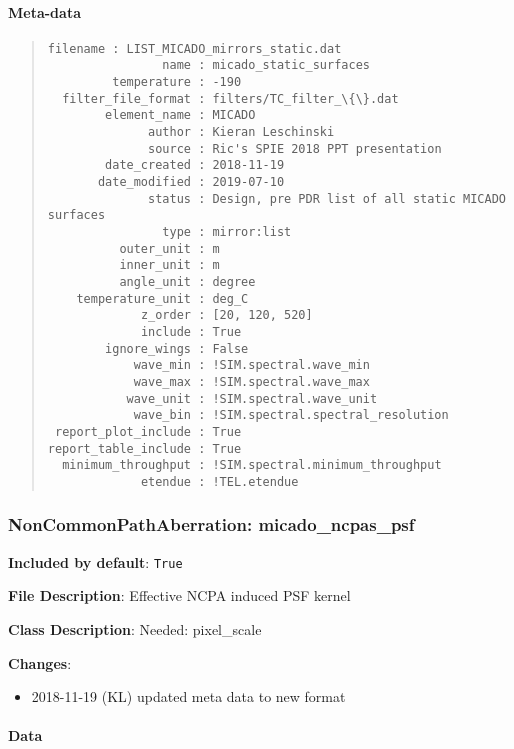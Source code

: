 \paragraph{Meta-data%
  \label{meta-data}%
}

\begin{quote}
\begin{alltt}
\begin{lstlisting}[frame=single]
            filename : LIST_MICADO_mirrors_static.dat
                name : micado_static_surfaces
         temperature : -190
  filter_file_format : filters/TC_filter_\{\}.dat
        element_name : MICADO
              author : Kieran Leschinski
              source : Ric's SPIE 2018 PPT presentation
        date_created : 2018-11-19
       date_modified : 2019-07-10
              status : Design, pre PDR list of all static MICADO surfaces
                type : mirror:list
          outer_unit : m
          inner_unit : m
          angle_unit : degree
    temperature_unit : deg_C
             z_order : [20, 120, 520]
             include : True
        ignore_wings : False
            wave_min : !SIM.spectral.wave_min
            wave_max : !SIM.spectral.wave_max
           wave_unit : !SIM.spectral.wave_unit
            wave_bin : !SIM.spectral.spectral_resolution
 report_plot_include : True
report_table_include : True
  minimum_throughput : !SIM.spectral.minimum_throughput
             etendue : !TEL.etendue
\end{lstlisting}
\end{alltt}
\end{quote}


\subsubsection{NonCommonPathAberration: \textquotedbl{}micado\_ncpas\_psf\textquotedbl{}%
  \label{noncommonpathaberration-micado-ncpas-psf}%
}

\textbf{Included by default}: \texttt{True}

\textbf{File Description}: Effective NCPA induced PSF kernel

\textbf{Class Description}: Needed: pixel\_scale

\textbf{Changes}:

\begin{itemize}
\item 2018-11-19 (KL) updated meta data to new format
\end{itemize}


\paragraph{Data%
  \label{id1}%
}

